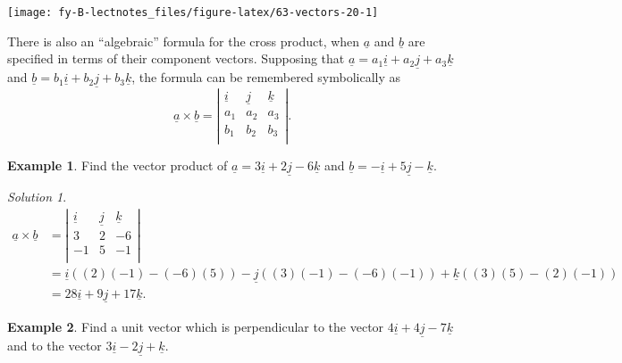 \documentclass[
  11pt,
  oneside]{book}
\newcommand{\slide}{}
\theoremstyle{definition}
\theoremstyle{definition}
\newtheorem{example}{Example}[chapter]
\theoremstyle{definition}
\theoremstyle{definition}
\theoremstyle{remark}
\newtheorem*{solution}{Solution}
\begin{document}
\begin{center}\texttt{[image: fy-B-lectnotes\_files/figure-latex/63-vectors-20-1]} \end{center}

\slide

There is also an ``algebraic'' formula for the cross product, when
\(\underline a\) and \(\underline b\) are specified in terms of their component vectors. Supposing that \(\underline a = a_1\underline i + a_2\underline j + a_3\underline k\) and \(\underline b = b_1\underline i + b_2\underline j + b_3\underline k\), the formula can be remembered symbolically as
\[
\underline a \times\underline b = \left|\begin{array}{ccc}\underline i&\underline j&\underline k\\a_1&a_2&a_3\\b_1&b_2&b_3\\\end{array}\right|.
\]
\slide

\begin{example}
Find the vector product of \(\underline a=3\underline i+2\underline j-6\underline k\) and \(\underline b=-\underline i + 5\underline j-\underline k\).
\end{example}

\begin{solution}
\begin{align*}
\underline a \times\underline b& = \left|\begin{array}{ccc}\underline i&\underline j&\underline k\\3&2&-6\\-1&5&-1\\\end{array}\right|\\
&= \underline i((2)(-1)-(-6)(5))-\underline j((3)(-1)-(-6)(-1))+\underline k((3)(5)-(2)(-1))\\
&=28\underline i+9\underline j+17\underline k.
\end{align*}
\end{solution}

\slide

\begin{example}
Find a unit vector which is perpendicular to the vector \(4\underline i+4\underline j-7\underline k\) and to the vector \(3\underline i - 2\underline j+\underline k\).
\end{example}
\end{document}
